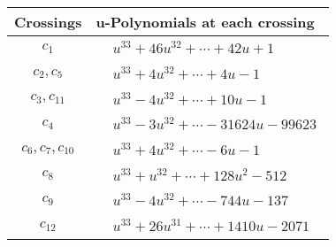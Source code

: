 \documentclass[1p]{elsarticle_modified}
\theoremstyle{definition}
\begin{document}
\begin{tabular}{m{50pt}|m{274pt}}
Crossings & \hspace{64pt}u-Polynomials at each crossing \\
\hline $$\begin{aligned}c_{1}\end{aligned}$$&$\begin{aligned}
&u^{33}+46 u^{32}+\cdots+42 u+1
\end{aligned}$\\
\hline $$\begin{aligned}c_{2},c_{5}\end{aligned}$$&$\begin{aligned}
&u^{33}+4 u^{32}+\cdots+4 u-1
\end{aligned}$\\
\hline $$\begin{aligned}c_{3},c_{11}\end{aligned}$$&$\begin{aligned}
&u^{33}-4 u^{32}+\cdots+10 u-1
\end{aligned}$\\
\hline $$\begin{aligned}c_{4}\end{aligned}$$&$\begin{aligned}
&u^{33}-3 u^{32}+\cdots-31624 u-99623
\end{aligned}$\\
\hline $$\begin{aligned}c_{6},c_{7},c_{10}\end{aligned}$$&$\begin{aligned}
&u^{33}+4 u^{32}+\cdots-6 u-1
\end{aligned}$\\
\hline $$\begin{aligned}c_{8}\end{aligned}$$&$\begin{aligned}
&u^{33}+u^{32}+\cdots+128 u^2-512
\end{aligned}$\\
\hline $$\begin{aligned}c_{9}\end{aligned}$$&$\begin{aligned}
&u^{33}-4 u^{32}+\cdots-744 u-137
\end{aligned}$\\
\hline $$\begin{aligned}c_{12}\end{aligned}$$&$\begin{aligned}
&u^{33}+26 u^{31}+\cdots+1410 u-2071
\end{aligned}$\\
\hline
\end{tabular}\\~\\
\end{document}
